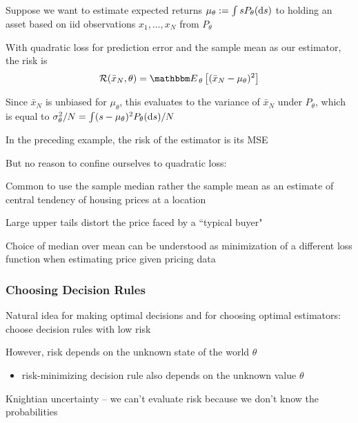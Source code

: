 \begin{frame}

    \Eg
    Suppose we want to estimate expected returns $\mu_\theta :=
    \int s P_\theta(\mathop{}\!\mathrm{d} s)$ to holding an asset based on {\sc iid}
    observations $x_1, \ldots, x_N$ from $P_\theta$
    
    \vspace{.7em}
    With quadratic loss for
    prediction error and the sample mean as our estimator, the risk is
    \begin{equation*}
        \label{eq:rsmean}
        \risk(\bar x_N, \theta) 
        = \EE_\theta \left[  (\bar x_N - \mu_\theta)^2 \right]
    \end{equation*}
    
    Since $\bar x_N$ is unbiased for $\mu_\theta$, this evaluates to the
    variance of $\bar x_N$ under $P_\theta$, which is
    equal to $\sigma_\theta^2/N = \int (s - \mu_\theta)^2 P_\theta (\mathop{}\!\mathrm{d} s)/N$ 
    
\end{frame}

\begin{frame}

    \vspace{2em}
    In the preceding example, the risk of the estimator is its MSE
    
    But no reason to confine ourselves to quadratic
    loss:
    
    \vspace{.7em}
    \Eg
    Common to use the sample median rather the sample mean as 
    an estimate of central tendency of housing prices at a location
    
    Large upper tails distort the price faced by a ``typical buyer"
    
    Choice of median over mean can be understood as 
    minimization of a different loss function when estimating price given
    pricing data
    
\end{frame}

\begin{frame}\frametitle{Choosing Decision Rules}

     \vspace{2em}
    Natural idea for making optimal decisions and for
    choosing optimal estimators: choose decision rules with
    low risk
    
    \vspace{.7em}
    However, risk depends on the unknown state of the world $\theta$
    \begin{itemize}
        \item risk-minimizing
    decision rule also depends on the unknown value $\theta$
    \end{itemize}

    Knightian uncertainty -- we can't evaluate risk because
    we don't know the probabilities

\end{frame}

